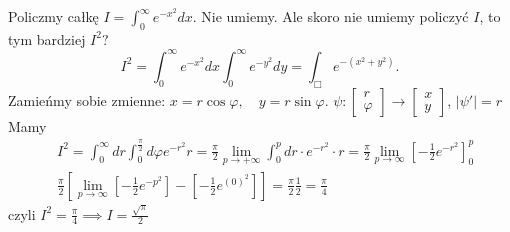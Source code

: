 \documentclass[../main.tex]{subfiles}
\begin{document}
    \begin{przyklad}
        Policzmy całkę $I = \int_0^{\infty}e^{-x^2}dx$. Nie umiemy. Ale skoro nie umiemy policzyć $I$, to tym bardziej $I^2?$
        \[
            I^2 = \int_0^{\infty}e^{-x^2}dx \int_0^{\infty}e^{-y^2}dy = \int_{\Box} e^{-(x^2+y^2)}
        .\]
        Zamieńmy sobie zmienne: $x = r\cos \varphi,\quad y = r\sin \varphi$. $\psi: \begin{bmatrix} r\\\varphi\end{bmatrix}\to \begin{bmatrix} x\\y \end{bmatrix}  $, $|\psi'| = r$
         Mamy
         \begin{align*}
             &I^2 = \int_0^{\infty}dr \int_0^{\frac{\pi}{2}}d\varphi e^{-r^2}r = \frac{\pi}{2} \lim\limits_{p\to +\infty} \int_0^p dr \cdot e^{-r^2} \cdot r = \frac{\pi}{2} \lim\limits_{p\to\infty} \left[ -\frac{1}{2}e^{-r^2} \right] _0^p\\
             &\frac{\pi}{2}\left[ \lim\limits_{p\to\infty}\left[ -\frac{1}{2}e^{-p^2} \right] - \left[ -\frac{1}{2}e^{(0)^2} \right]  \right] = \frac{\pi}{2} \frac{1}{2} = \frac{\pi}{4}
         \end{align*}
         czyli $I^2 = \frac{\pi}{4} \implies I = \frac{\sqrt{\pi} }{2}$
    \end{przyklad}
\end{document}
